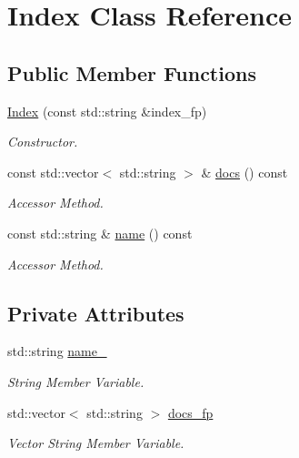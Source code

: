 \hypertarget{class_index}{}\section{Index Class Reference}
\label{class_index}
\subsection*{Public Member Functions}
\begin{DoxyCompactItemize}
\item 
\hyperlink{class_index_aa9d4e7751fa8bdd7452858f641d8c912}{Index} (const std\+::string \&index\+\_\+fp)
\begin{DoxyCompactList}\small\item\em Constructor. \end{DoxyCompactList}\item 
const std\+::vector$<$ std\+::string $>$ \& \hyperlink{class_index_a6d6dfe2b2a058065c9e62d4f6c285a48}{docs} () const
\begin{DoxyCompactList}\small\item\em Accessor Method. \end{DoxyCompactList}\item 
const std\+::string \& \hyperlink{class_index_a187d69bacb4870d4dff6b37584df0925}{name} () const
\begin{DoxyCompactList}\small\item\em Accessor Method. \end{DoxyCompactList}\end{DoxyCompactItemize}
\subsection*{Private Attributes}
\begin{DoxyCompactItemize}
\item 
std\+::string \hyperlink{class_index_a66c168cae41b8ad8a683163c34772b81}{name\+\_\+}
\begin{DoxyCompactList}\small\item\em String Member Variable. \end{DoxyCompactList}\item 
std\+::vector$<$ std\+::string $>$ \hyperlink{class_index_ab62d558f26d98409751e445a806a77b8}{docs\+\_\+fp}
\begin{DoxyCompactList}\small\item\em Vector String Member Variable. \end{DoxyCompactList}\end{DoxyCompactItemize}
